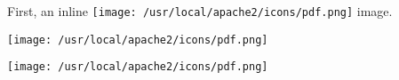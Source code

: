 \documentclass[letterpaper]{article}
\begin{document}
First, an inline
\texttt{[image: /usr/local/apache2/icons/pdf.png]}
image.

\texttt{[image: /usr/local/apache2/icons/pdf.png]}

\texttt{[image: /usr/local/apache2/icons/pdf.png]}
\end{document}
